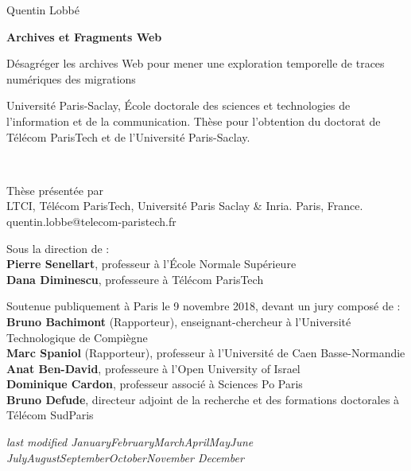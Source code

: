 \documentclass{tufte-book}
\newcommand{\monthyear}{%
  \ifcase\month\or January\or February\or March\or April\or May\or June\or
  July\or August\or September\or October\or November\or
  December\fi\space\number\year
}
\newcommand{\blankpage}{\newpage\hbox{}\thispagestyle{empty}\newpage}
\begin{document}
\frontmatter


\newpage
\author{Quentin Lobbé}
\title{}
\cleardoublepage
{  
  \begin{fullwidth}%
  \thispagestyle{empty} 
  \setlength{\parskip}{\baselineskip}
  \begingroup
  \vspace*{10em}
  \par\noindent\Large{Quentin Lobbé}
  \vspace*{-1em}
  \par\noindent\Huge\textbf{Archives et Fragments Web}
  \par\noindent\nohyphenation\Large{Désagréger les archives Web pour mener une exploration temporelle de traces numériques des migrations}
  \endgroup
  \vfill  
  \par\noindent\nohyphenation Université Paris-Saclay, École doctorale des sciences et technologies de l'information et de la communication.  Thèse pour l'obtention du doctorat de Télécom ParisTech et de l'Université Paris-Saclay.    
  \end{fullwidth}%
}

\blankpage

  
\newpage
\begin{fullwidth}
~\vfill
\thispagestyle{empty}
\setlength{\parskip}{\baselineskip}

\par\noindent Thèse présentée par \textbf{\thanklessauthor}\\
LTCI, Télécom ParisTech, Université Paris Saclay \& Inria. Paris, France.\\
quentin.lobbe@telecom-paristech.fr

\par\noindent Sous la direction de :\\
\textbf{Pierre Senellart}, professeur à l'École Normale Supérieure\\
\textbf{Dana Diminescu}, professeure à Télécom ParisTech

\par\noindent Soutenue publiquement à Paris le 9 novembre 2018, devant un jury composé de :\\
\textbf{Bruno Bachimont} (Rapporteur), enseignant-chercheur à l'Université Technologique de Compiègne\\
\textbf{Marc Spaniol} (Rapporteur), professeur à l'Université de Caen Basse-Normandie\\
\textbf{Anat Ben-David}, professeure à l'Open University of Israel\\
\textbf{Dominique Cardon}, professeur associé à Sciences Po Paris\\
\textbf{Bruno Defude}, directeur adjoint de la recherche et des formations doctorales à Télécom SudParis

\par\textit{last modified \monthyear}
\end{fullwidth}
  
\end{document}

